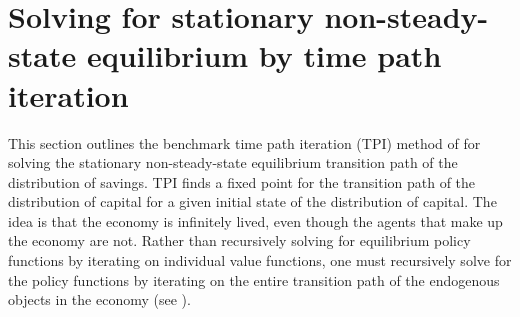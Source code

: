 %
%
%
%

\section{Solving for stationary non-steady-state equilibrium by time path iteration}\label{AppNonSSsolve}

  \setcounter{equation}{0}

  This section outlines the benchmark time path iteration (TPI) method of \citet{AuerbachKotlikoff:1987} for solving the stationary non-steady-state equilibrium transition path of the distribution of savings. TPI finds a fixed point for the transition path of the distribution of capital for a given initial state of the distribution of capital. The idea is that the economy is infinitely lived, even though the agents that make up the economy are not. Rather than recursively solving for equilibrium policy functions by iterating on individual value functions, one must recursively solve for the policy functions by iterating on the entire transition path of the endogenous objects in the economy (see \citet[ch. 17]{StokeyLucas:1989}).

